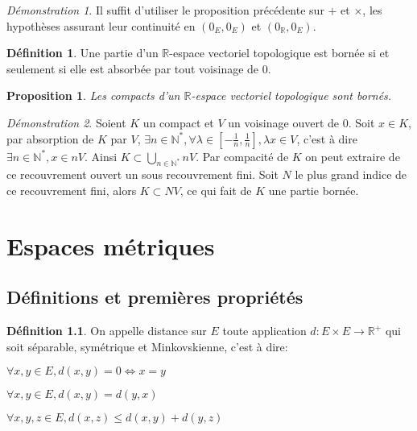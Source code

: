 \documentclass[a4paper, 11pt, french]{book}
\newenvironment{itemise}{\itemize}{\enditemize}
\theoremstyle{plain} %
\newtheorem{proposition}{Proposition}
\theoremstyle{definition} %
\newtheorem{definition}{Définition}
\theoremstyle{remark} %
\newtheorem*{demonstration}{Démonstration}
\newcommand{\1}{\mathds{1}}
\newcommand{\N}{\mathbb{N}}
\newcommand{\R}{\mathbb{R}}
\begin{document}
\begin{demonstration}
	Il suffit d'utiliser le proposition précédente sur $+$ et $\times$, les hypothèses assurant leur continuité en $(0_E, 0_E)$ et $(0_\R, 0_E)$.
\end{demonstration}

\begin{definition}
	Une partie d'un $\R$-espace vectoriel topologique est bornée si et seulement si elle est absorbée par tout voisinage de 0.
\end{definition}

\begin{proposition}
	Les compacts d'un $\R$-espace vectoriel topologique sont bornés.
\end{proposition}

\begin{demonstration}
	Soient $K$ un compact et $V$ un voisinage ouvert de 0.
	Soit $x\in K$, par absorption de $K$ par $V$, $\exists n\in\N^*, \forall\lambda\in[-\frac{1}{n}, \frac{1}{n}], \lambda x\in V$, c'est à dire $\exists n\in\N^*, x\in nV$.
	Ainsi $K\subset\bigcup_{n\in\N^*}nV$.
	Par compacité de $K$ on peut extraire de ce recouvrement ouvert un sous recouvrement fini.
	Soit $N$ le plus grand indice de ce recouvrement fini, alors $K\subset NV$, ce qui fait de $K$ une partie bornée.
\end{demonstration}

\chapter{Espaces métriques}

\section{Définitions et premières propriétés}

\begin{definition}
	On appelle distance sur $E$ toute application $d:E\times E\rightarrow\R^+$ qui soit séparable, symétrique et Minkovskienne, c'est à dire:
	\begin{itemise}
		\item $\forall x, y\in E, d(x, y)=0\iff x=y$
		\item $\forall x, y\in E, d(x, y)=d(y, x)$
		\item $\forall x, y, z\in E, d(x, z)\leqslant d(x, y)+d(y, z)$
	\end{itemise}
\end{definition}
\end{document}
